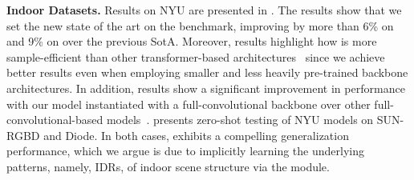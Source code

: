 \noindent{}\textbf{Indoor Datasets.} Results on NYU are presented in . The results show that we set the new state of the art on the benchmark, improving by more than 6\% on  and 9\% on  over the previous SotA. Moreover, results highlight how \ourmodel is more sample-efficient than other transformer-based architectures~\cite{Ranftl2021, Yang2021, Bhat2020, Yuan2022, Bhat2022} since we achieve better results even when employing smaller and less heavily pre-trained backbone architectures. In addition, results show a significant improvement in performance with our model instantiated with a full-convolutional backbone over other full-convolutional-based models~\cite{Eigen2014, Fu2018, Lee2019, Huynh2020, Patil2022}.  presents zero-shot testing of NYU models on SUN-RGBD and Diode. In both cases, \ourmodel exhibits a compelling generalization performance, which we argue is due to implicitly learning the underlying patterns, namely, IDRs, of indoor scene structure via the \ourmodule module. 
\begin{table}[]
    \centering
    \caption{\textbf{Zero-shot testing of models trained on NYU.} All methods are trained on NYU and tested without further fine-tuning on the official validation set of SUN-RGBD and Diode Indoor.}
    \vspace{-10pt}
    \label{tab:nyu_zeroshot}
    \vspace{-10pt}
\end{table}

